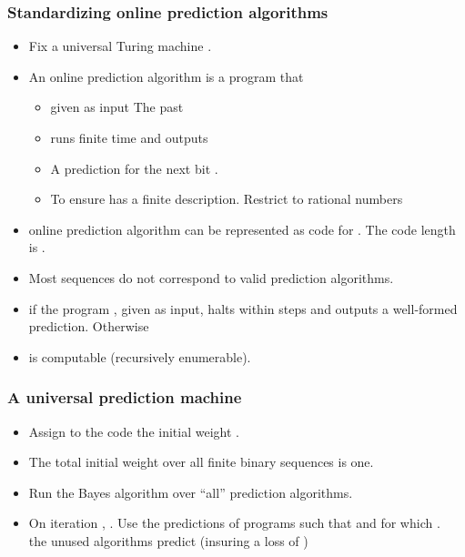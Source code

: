 \documentclass{beamer}
\begin{document}
\begin{frame}
\frametitle{Standardizing online prediction algorithms}
\begin{itemize}
\item Fix a universal Turing machine .
\item An online prediction algorithm  is a program that 
\begin{itemize}
\item
given as input {\color{blue} The past} 
\item runs finite time and outputs
\item
A prediction for the next bit .
\item 
To ensure  has a finite description. Restrict to {\color{blue}rational} numbers 
\end{itemize}

\item {} online prediction algorithm can be represented as code 
for . The code length is .
\item Most sequences do not correspond to valid prediction algorithms. 
\item 
{} if the program \R{$\vb$}, given \R{$\X$} as input, 
halts within  steps and outputs a well-formed prediction. Otherwise 
\item {} is computable (recursively enumerable).
\end{itemize}
\end{frame}

\begin{frame}
\frametitle{A universal prediction machine}
\begin{itemize}
\item Assign to the code \R{$\vb$} the initial weight .
\item The total initial weight over all finite binary sequences is one.
\item Run the Bayes algorithm over ``all'' prediction algorithms.
\item {} On iteration , . 
Use the predictions of 
programs \R{$\vb$} such that  and for which
.\\
the unused algorithms predict  (insuring a loss of )
\end{itemize}
\end{frame}
\end{document}
